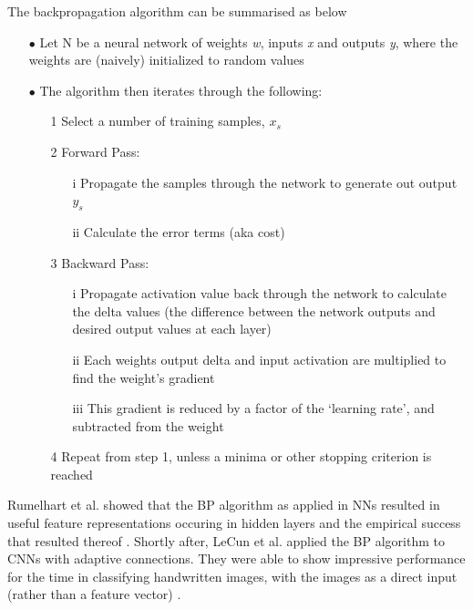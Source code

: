 \documentclass[a4paper,latin]{paper}
\begin{document}
The backpropagation algorithm can be summarised as below
\begin{itemize}
\item[$\bullet$]  Let N be a neural network of weights \textit{w}, inputs \textit{x} and outputs \textit{y}, where the weights are (naively) initialized to random values
\item[$\bullet$] The algorithm then iterates through the following:
\begin{itemize}
  \item[1] Select a number of training samples, $x_s$
  \item[2]Forward Pass:
  \begin{itemize}
    \item[i] Propagate the samples through the network to generate out output $y_s$
    \item[ii] Calculate the error terms (aka cost)
  \end{itemize}
\item[3]Backward Pass:
\begin{itemize}
  \item[i] Propagate activation value back through the network to calculate the delta values (the difference between the network outputs and desired output values at each layer)
  \item[ii] Each weights output delta and input activation are multiplied to find the weight’s gradient
  \item[iii]This gradient is reduced by a factor of the ‘learning rate’, and subtracted from the weight
\end{itemize}
\item[4] Repeat from step 1, unless a minima or other stopping criterion is reached

\end{itemize}
\end{itemize}

\hfill \break 

Rumelhart et al. showed that the BP algorithm as applied in NNs resulted in useful feature representations 
occuring in hidden layers and the empirical success that resulted thereof \cite{Rumelhart}.  
Shortly after, LeCun et al. applied the BP algorithm to CNNs with adaptive connections. They were able to show 
impressive performance for the time in classifying handwritten images, with the images as a direct input (rather than a feature vector) \cite{LeCun3}.
\hfill \break 
\end{document}
